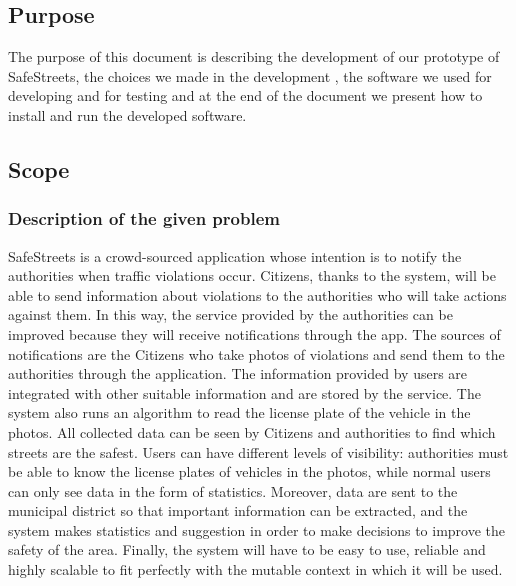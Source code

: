 
\subsection{Purpose}
The purpose of this document is describing the development of our prototype of SafeStreets, the choices we made in the development , the software we used for developing and for testing and at the end of the document we present how to install and run the developed software.

\subsection{Scope}
\subsubsection{Description of the given problem}
SafeStreets is a crowd-sourced application whose intention is to notify the authorities when traffic
violations occur. Citizens, thanks to the system, will be able to send information about violations to the
authorities who will take actions against them. In this way, the service provided by the authorities can be
improved because they will receive notifications through the app. The sources of notifications are the
Citizens who take photos of violations and send them to the authorities through
the application. The information provided by users are integrated with other suitable information and are
stored by the service. The system also runs an algorithm to read the license plate of the vehicle in the
photos. All collected data can be seen by Citizens and authorities to find which streets are the safest.
Users can have different levels of visibility: authorities must be able to know the license plates of vehicles
in the photos, while normal users can only see data in the form of statistics. Moreover, data are sent to the municipal district so that important information can be extracted, and the system makes statistics and suggestion in order to make decisions to improve the safety of the area. Finally, the system will have to be easy to use, reliable
and highly scalable to fit perfectly with the mutable context in which it will be used.



